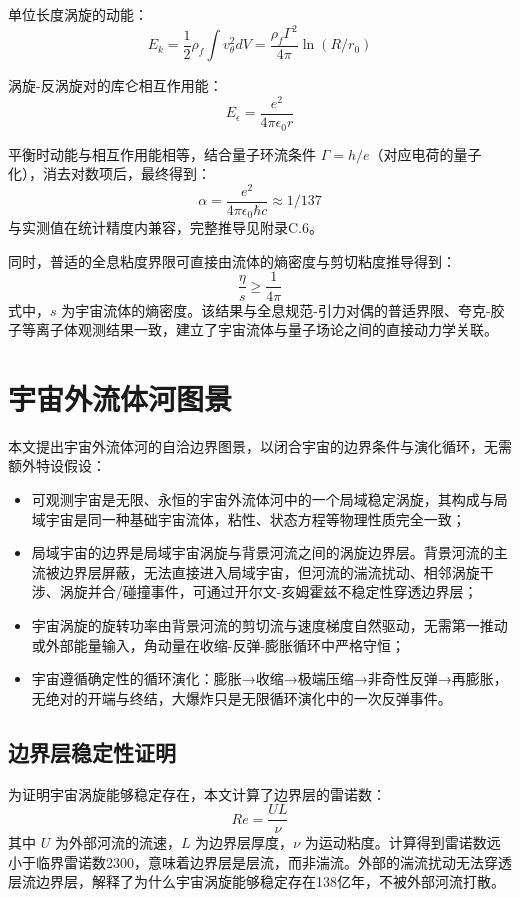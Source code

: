 \documentclass[aps,prd,preprint,superscriptaddress,floatfix,numbers,sort&compress]{revtex4-2}
\begin{document}
单位长度涡旋的动能：
\begin{equation}
E_{k}=\frac{1}{2} \rho_{f} \int v_{\theta}^{2} d V=\frac{\rho_{f} \Gamma^{2}}{4 \pi} \ln (R / r_{0})
\label{eq:vortex_kinetic}
\end{equation}

涡旋-反涡旋对的库仑相互作用能：
\begin{equation}
E_{\epsilon}=\frac{e^{2}}{4 \pi \epsilon_{0} r}
\label{eq:coulomb_energy}
\end{equation}

平衡时动能与相互作用能相等，结合量子环流条件 $\Gamma=h / e$（对应电荷的量子化），消去对数项后，最终得到：
\begin{equation}
\alpha=\frac{e^{2}}{4 \pi \epsilon_{0} \hbar c} \approx 1 / 137
\label{eq:alpha}
\end{equation}
与实测值在统计精度内兼容，完整推导见附录C.6。

同时，普适的全息粘度界限可直接由流体的熵密度与剪切粘度推导得到：
\begin{equation}
\frac{\eta}{s} \geq \frac{1}{4 \pi}
\label{eq:viscosity_bound}
\end{equation}
式中，$s$ 为宇宙流体的熵密度。该结果与全息规范-引力对偶的普适界限、夸克-胶子等离子体观测结果一致，建立了宇宙流体与量子场论之间的直接动力学关联。

\section{宇宙外流体河图景}
本文提出宇宙外流体河的自洽边界图景，以闭合宇宙的边界条件与演化循环，无需额外特设假设：
\begin{itemize}
    \item 可观测宇宙是无限、永恒的宇宙外流体河中的一个局域稳定涡旋，其构成与局域宇宙是同一种基础宇宙流体，粘性、状态方程等物理性质完全一致；
    \item 局域宇宙的边界是局域宇宙涡旋与背景河流之间的涡旋边界层。背景河流的主流被边界层屏蔽，无法直接进入局域宇宙，但河流的湍流扰动、相邻涡旋干涉、涡旋并合/碰撞事件，可通过开尔文-亥姆霍兹不稳定性穿透边界层；
    \item 宇宙涡旋的旋转功率由背景河流的剪切流与速度梯度自然驱动，无需第一推动或外部能量输入，角动量在收缩-反弹-膨胀循环中严格守恒；
    \item 宇宙遵循确定性的循环演化：膨胀→收缩→极端压缩→非奇性反弹→再膨胀，无绝对的开端与终结，大爆炸只是无限循环演化中的一次反弹事件。
\end{itemize}

\subsection{边界层稳定性证明}
为证明宇宙涡旋能够稳定存在，本文计算了边界层的雷诺数：
\begin{equation}
Re=\frac{U L}{\nu}
\label{eq:reynolds}
\end{equation}
其中 $U$ 为外部河流的流速，$L$ 为边界层厚度，$\nu$ 为运动粘度。计算得到雷诺数远小于临界雷诺数2300，意味着边界层是层流，而非湍流。外部的湍流扰动无法穿透层流边界层，解释了为什么宇宙涡旋能够稳定存在138亿年，不被外部河流打散。
\end{document}
